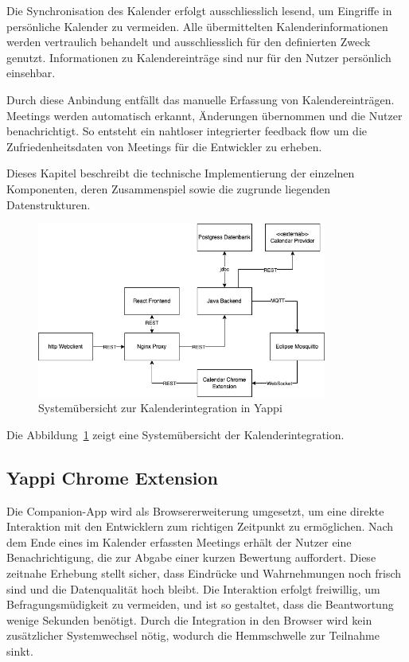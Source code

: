 \documentclass[12pt,a4paper]{report}
\begin{document}
        Die Synchronisation des Kalender erfolgt ausschliesslich lesend, um Eingriffe in persönliche Kalender zu vermeiden.
        Alle übermittelten Kalenderinformationen werden vertraulich behandelt und ausschliesslich für den definierten Zweck genutzt.
        Informationen zu Kalendereinträge sind nur für den Nutzer persönlich einsehbar.

        Durch diese Anbindung entfällt das manuelle Erfassung von Kalendereinträgen. Meetings werden automatisch erkannt,
        Änderungen übernommen und die Nutzer benachrichtigt. So entsteht ein nahtloser integrierter feedback flow um die
        Zufriedenheitsdaten von Meetings für die Entwickler zu erheben.

        Dieses Kapitel beschreibt die technische Implementierung der einzelnen Komponenten, deren Zusammenspiel
        sowie die zugrunde liegenden Datenstrukturen.


        \begin{figure}[H]
          \centering
          \includegraphics[width=0.85\textwidth]{../figures/implementation-claendar-companion-system.drawio.png}
          \caption{Systemübersicht zur Kalenderintegration in Yappi}
          \label{fig:implementation-calendar-companion-system}
        \end{figure}

        Die Abbildung~\ref{fig:implementation-calendar-companion-system} zeigt eine Systemübersicht der Kalenderintegration.

  \subsection{Yappi Chrome Extension}
      Die Companion-App wird als Browsererweiterung umgesetzt, um eine direkte Interaktion mit den Entwicklern zum richtigen
      Zeitpunkt zu ermöglichen. Nach dem Ende eines im Kalender erfassten Meetings erhält der Nutzer eine Benachrichtigung,
      die zur Abgabe einer kurzen Bewertung auffordert. Diese zeitnahe Erhebung stellt sicher, dass Eindrücke und Wahrnehmungen
      noch frisch sind und die Datenqualität hoch bleibt. Die Interaktion erfolgt freiwillig, um Befragungsmüdigkeit zu vermeiden,
      und ist so gestaltet, dass die Beantwortung wenige Sekunden benötigt. Durch die Integration in den Browser wird kein
      zusätzlicher Systemwechsel nötig, wodurch die Hemmschwelle zur Teilnahme sinkt.
\end{document}
